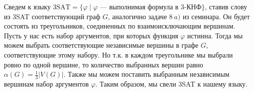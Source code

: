 \begin{task}{3}
Сведем к языку $\text{3SAT} = \{\varphi \mid \varphi \text{~--- выполнимая формула в $3$-КНФ}\}$, ставив слову из 3SAT соответствующий граф $G$, аналогично задаче $8~a)$ из семинара. Он будет состоять из треугольников, соединенных по взаимоисключающим вершинам. Пусть у нас есть набор аргументов, при которых функция $\varphi$ истинна. Тогда мы можем выбрать соответствующие независимые вершины в графе $G$, соответствующие этому набору. Но т.к. в каждом треугольнике мы выбрали ровно по одной вершине, то количество выбранных вершин равно $\alpha(G) = \frac{1}{3}|V(G)|$. Также мы можем поставить выбранным независимым вершинам набор аргументов $\varphi$. Таким образом, мы свели 3SAT к нашему языку.
\end{task}
